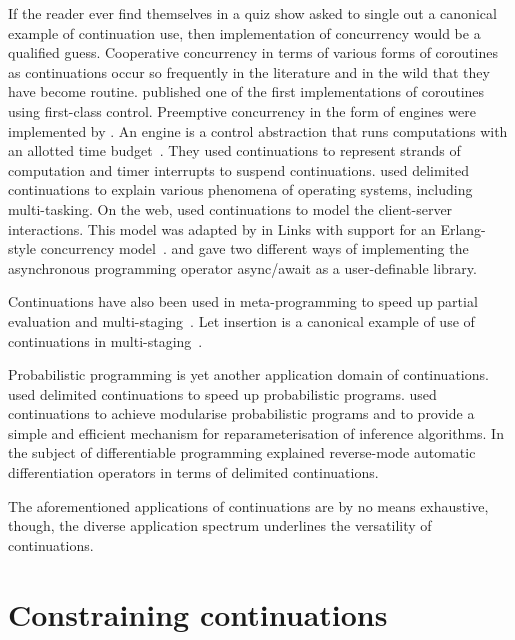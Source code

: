 \documentclass[12pt,phd,lfcs,twoside,openright,logo,leftchapter,normalheadings]{infthesis}
\theoremstyle{plain}
\theoremstyle{definition}
\begin{document}
If the reader ever find themselves in a quiz show asked to single out
a canonical example of continuation use, then implementation of
concurrency would be a qualified guess. Cooperative concurrency in
terms of various forms of coroutines as continuations occur so
frequently in the literature and in the wild that they have become
routine.
%
\citet{HaynesFW86} published one of the first implementations of
coroutines using first-class control.
%
Preemptive concurrency in the form of engines were implemented by
\citet{DybvigH89}. An engine is a control abstraction that runs
computations with an allotted time budget~\cite{HaynesF84}. They used
continuations to represent strands of computation and timer interrupts
to suspend continuations.
%
\citet{KiselyovS07a} used delimited continuations to explain various
phenomena of operating systems, including multi-tasking.
%
On the web, \citet{Queinnec04} used continuations to model the
client-server interactions. This model was adapted by
\citet{CooperLWY06} in Links with support for an Erlang-style
concurrency model~\cite{ArmstrongVW93}.
%
\citet{Leijen17a} and \citet{DolanEHMSW17} gave two different ways of
implementing the asynchronous programming operator async/await as a
user-definable library.

Continuations have also been used in meta-programming to speed up
partial evaluation and
multi-staging~\cite{LawallD94,KameyamaKS11,OishiK17,Yallop17,WeiBTR20}. Let
insertion is a canonical example of use of continuations in
multi-staging~\cite{Yallop17}.

Probabilistic programming is yet another application domain of
continuations.  \citet{KiselyovS09} used delimited continuations to
speed up probabilistic programs. \citet{GorinovaMH20} used
continuations to achieve modularise probabilistic programs and to
provide a simple and efficient mechanism for reparameterisation of
inference algorithms.
%
In the subject of differentiable programming \citet{WangZDWER19}
explained reverse-mode automatic differentiation operators in terms of
delimited continuations.

The aforementioned applications of continuations are by no means
exhaustive, though, the diverse application spectrum underlines the
versatility of continuations.

\section{Constraining continuations}
\label{sec:constraining-continuations}
\end{document}
